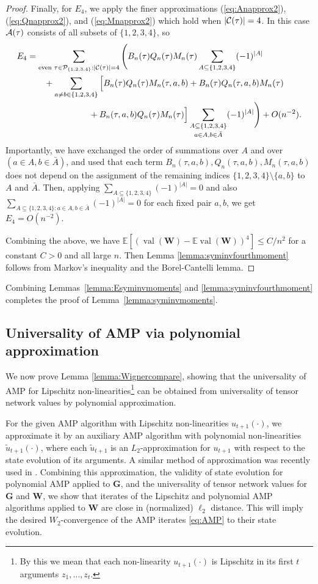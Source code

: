 \documentclass[10pt,reqno]{amsart}
\def\W{\mathbf{W}}
\def\G{\mathbf{G}}
\def\E{\mathbb{E}}
\def\val{\operatorname{val}}
\begin{document}
\begin{proof}
Finally, for $E_4$, we apply the finer approximations
(\ref{eq:Anapprox2}), (\ref{eq:Qnapprox2}), and (\ref{eq:Mnapprox2}) which hold
when $|\mathcal{C}(\tau)|=4$. In this case $\mathcal{A}(\tau)$ consists of all subsets of
$\{1,2,3,4\}$, so
\begin{align*}
E_4&=\sum_{\text{even } \tau \in
\mathcal{P}_{\{1,2,3,4\}}:|\mathcal{C}(\tau)|=4} \Bigg(B_n(\tau)Q_n(\tau)M_n(\tau)
\sum_{A \subseteq \{1,2,3,4\}} (-1)^{|A|}\\
&\qquad+\sum_{a \neq b \in \{1,2,3,4\}} \Big[B_n(\tau)Q_n(\tau)M_n(\tau,a,b)
+B_n(\tau)Q_n(\tau,a,b)M_n(\tau)\\
&\hspace{1in}+B_n(\tau,a,b)Q_n(\tau)M_n(\tau)\Big]
\mathop{\sum_{A \subseteq \{1,2,3,4\}}}_{a \in A,b \in \bar{A}}
(-1)^{|A|}\Bigg)+O(n^{-2}).
\end{align*}
Importantly, we have exchanged the order of summations over $A$ and
over $(a \in A,b \in \bar A)$, and used that each term $B_n(\tau,a,b),Q_n(\tau,a,b),M_n(\tau,a,b)$
does not depend on the assignment of
the remaining indices $\{1,2,3,4\} \setminus \{a,b\}$ to $A$ and $\bar A$.
Then, applying $\sum_{A \subseteq \{1,2,3,4\}} (-1)^{|A|}=0$
and also $\sum_{A \subseteq \{1,2,3,4\}:a \in A,b \in \bar{A}} (-1)^{|A|} =0$ for each fixed
pair $a,b$, we get $E_4=O(n^{-2})$.

Combining the above, we have $\E[(\val(\W)-\E \val(\W))^4] \leq C/n^2$
for a constant $C>0$ and all large $n$.
Then Lemma \ref{lemma:syminvfourthmoment} follows from
Markov's inequality and the Borel-Cantelli lemma.
\end{proof}

Combining Lemmas~\ref{lemma:Esyminvmoments} and \ref{lemma:syminvfourthmoment}
completes the proof of Lemma~\ref{lemma:syminvmoments}.


\subsection{Universality of AMP via polynomial approximation}
We now prove Lemma \ref{lemma:Wignercompare},
showing that the universality of AMP for Lipschitz non-linearities\footnote{By
this we mean that each non-linearity $u_{t+1}(\cdot)$ is Lipschitz 
in its first $t$ arguments $z_1,\ldots,z_t$.} can be obtained from universality of tensor network values by polynomial approximation.

For the given AMP algorithm with Lipschitz non-linearities $u_{t+1}(\cdot)$,
we approximate it by an auxiliary AMP algorithm with polynomial 
non-linearities $\tilde{u}_{t+1}(\cdot)$, where each $\tilde{u}_{t+1}$ is an 
$L_2$-approximation for $u_{t+1}$ with respect to the state evolution of its 
arguments.
A similar method of approximation was recently
used in \cite{dudeja2022universality}.
Combining this approximation, the validity of state evolution for
polynomial AMP applied to $\G$, and
the universality of tensor network values for $\G$ and $\W$,
we show that iterates of the Lipschitz and polynomial AMP algorithms applied to
$\W$ are close in (normalized) $\ell_2$ distance. This will imply the desired 
$W_2$-convergence of the AMP iterates \eqref{eq:AMP} to their state evolution.
\end{document}
